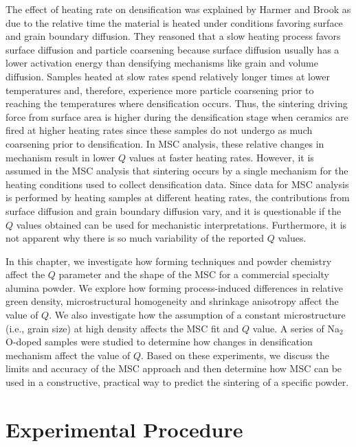 The effect of heating rate on densification was explained by Harmer and Brook \cite{Harmer1981} as due to the relative time the material is heated under conditions favoring surface and grain boundary diffusion. They reasoned that a slow heating process favors surface diffusion and particle coarsening because surface diffusion usually has a lower activation energy than densifying mechanisms like grain and volume diffusion. Samples heated at slow rates spend relatively longer times at lower temperatures and, therefore, experience more particle coarsening prior to reaching the temperatures where densification occurs. Thus, the sintering driving force from surface area is higher during the densification stage when ceramics are fired at higher heating rates since these samples do not undergo as much coarsening prior to densification. In MSC analysis, these relative changes in mechanism result in lower $Q$ values at faster heating rates. However, it is assumed in the MSC analysis that sintering occurs by a single mechanism for the heating conditions used to collect densification data. Since data for MSC analysis is performed by heating samples at different heating rates, the contributions from surface diffusion and grain boundary diffusion vary, and it is questionable if the $Q$ values obtained can be used for mechanistic interpretations. Furthermore, it is not apparent why there is so much variability of the reported $Q$ values.  

In this chapter, we investigate how forming techniques and powder chemistry affect the $Q$ parameter and the shape of the MSC for a commercial specialty alumina powder. We explore how forming process-induced differences in relative green density, microstructural homogeneity and shrinkage anisotropy affect the value of $Q$. We also investigate how the assumption of a constant microstructure (i.e., grain size) at high density affects the MSC fit and $Q$ value. A series of Na$_{2}$O-doped samples were studied to determine how changes in densification mechanism affect the value of $Q$.  Based on these experiments, we discuss the limits and accuracy of the MSC approach and then determine how MSC can be used in a constructive, practical way to predict the sintering of a specific powder.

\section{Experimental Procedure}

